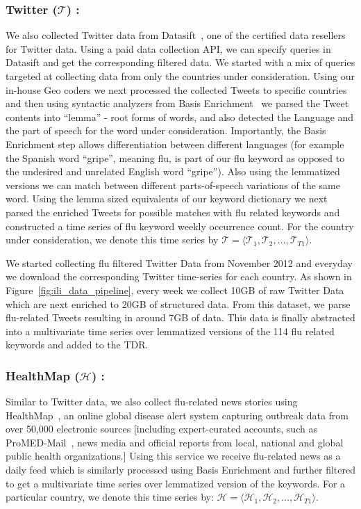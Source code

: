 \subsubsection{Twitter ($\mathcal{T}$) :} 
We also collected Twitter data from Datasift~\cite{Twitter:2013},
one of the certified data resellers for
Twitter data. Using a paid data collection API, we can specify queries in
Datasift and get the corresponding filtered data.  We started with a mix of
queries targeted at collecting data from only the countries under
consideration. Using our in-house Geo coders we next processed the collected
Tweets to specific countries and then using syntactic analyzers from Basis
Enrichment~\cite{Basis:2013} we parsed the Tweet contents into ``lemma'' - root
forms of words, and also detected the Language and the part of speech for the
word under consideration.  Importantly, the Basis Enrichment step allows
differentiation between different languages (for example the Spanish word
``gripe'', meaning flu, is part of our flu keyword as opposed to the undesired
and unrelated English word ``gripe''). Also using the lemmatized versions we
can match between different parts-of-speech variations of the same word. Using
the lemma sized equivalents of our keyword dictionary we next parsed the
enriched Tweets for possible matches with flu related keywords and constructed
a time series of flu keyword weekly occurrence count. For the country under
consideration, we denote this time series by 
$\mathcal{T} = \langle \mathcal{T}_1, \mathcal{T}_2, \dots, \mathcal{T}_{T1} \rangle$.

We started collecting flu filtered Twitter Data from November 2012 and everyday
we download the corresponding Twitter time-series for each country. As shown in
Figure~\ref{fig:ili_data_pipeline}, every week we collect 10GB of raw Twitter
Data which are next enriched to 20GB of structured data. From this dataset, we
parse flu-related Tweets resulting in around 7GB of data. This data is finally
abstracted into a multivariate time series over lemmatized versions of the 114
flu related keywords and added to the TDR. 

\subsubsection{HealthMap ($\mathcal{H}$) :} 
Similar to Twitter data, we also collect flu-related
news stories using HealthMap~\cite{HM:2013}, an online global disease alert
system capturing outbreak data from over 50,000 electronic sources [including
  expert-curated accounts, such as ProMED-Mail~\cite{chase1996promed}, news media
and official reports from local, national and global public health
organizations.] Using this service we receive flu-related news as a daily feed
which is similarly processed using Basis Enrichment and further filtered to get
a multivariate time series over  lemmatized version of the keywords. For a
particular country, we denote this time series by: 
$\mathcal{H} = \langle \mathcal{H}_1, \mathcal{H}_2, \dots, \mathcal{H}_{T1} \rangle$.

